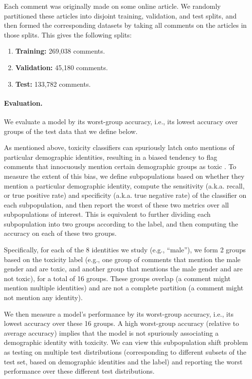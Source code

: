 Each comment was originally made on some online article. We randomly partitioned these articles into disjoint training, validation, and test splits, and then formed the corresponding datasets by taking all comments on the articles in those splits. This gives the following splits:
\begin{enumerate}
  \item \textbf{Training:} 269,038 comments.
  \item \textbf{Validation:} 45,180 comments.
  \item \textbf{Test:} 133,782 comments.
\end{enumerate}

\paragraph{Evaluation.}
We evaluate a model by its worst-group accuracy, i.e., its lowest accuracy over groups of the test data that we define below.

As mentioned above, toxicity classifiers can spuriously latch onto mentions of particular demographic identities, resulting in a biased tendency to flag comments that innocuously mention certain demographic groups as toxic \citep{park2018reducing, dixon2018measuring}.
To measure the extent of this bias, we define subpopulations based on whether they mention a particular demographic identity, compute the sensitivity (a.k.a. recall, or true positive rate) and specificity (a.k.a. true negative rate) of the classifier on each subpopulation,
and then report the worst of these two metrics over all subpopulations of interest.
This is equivalent to further dividing each subpopulation into two groups according to the label, and then computing the accuracy on each of these two groups.

Specifically, for each of the 8 identities we study (e.g., ``male''), we form 2 groups based on the toxicity label
(e.g., one group of comments that mention the male gender and are toxic, and another group that mentions the male gender and are not toxic), for a total of 16 groups.
These groups overlap (a comment might mention multiple identities) and are not a complete partition (a comment might not mention any identity).

We then measure a model's performance by its worst-group accuracy, i.e., its lowest accuracy over these 16 groups.
A high worst-group accuracy (relative to average accuracy) implies that the model is not spuriously associating a demographic identity with toxicity.
We can view this subpopulation shift problem as testing on multiple test distributions (corresponding to different subsets of the test set, based on demographic identities and the label) and reporting the worst performance over these different test distributions.

